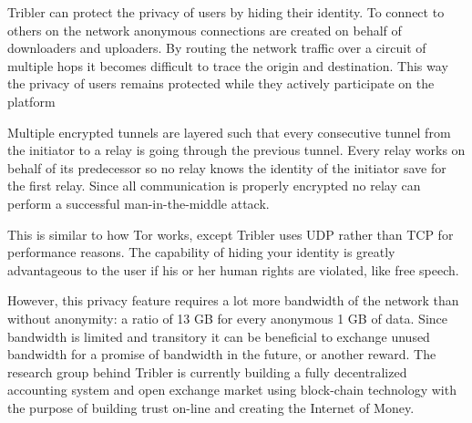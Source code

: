 Tribler can protect the privacy of users by hiding their identity.
To connect to others on the network anonymous connections are created on behalf of downloaders and uploaders.
By routing the network traffic over a circuit of multiple hops it becomes difficult to trace the origin and destination.
This way the privacy of users remains protected while they actively participate on the platform

Multiple encrypted tunnels are layered such that every consecutive tunnel from the initiator to a relay is going through the previous tunnel.
Every relay works on behalf of its predecessor so no relay knows the identity of the initiator save for the first relay.
Since all communication is properly encrypted no relay can perform a successful man-in-the-middle attack.

This is similar to how Tor works, except Tribler uses UDP rather than TCP for performance reasons.
The capability of hiding your identity is greatly advantageous to the user if his or her human rights are violated, like free speech.

However, this privacy feature requires a lot more bandwidth of the network than without anonymity: a ratio of 13 GB for every anonymous 1 GB of data.
Since bandwidth is limited and transitory it can be beneficial to exchange unused bandwidth for a promise of bandwidth in the future, or another reward.
The research group behind Tribler is currently building a fully decentralized accounting system and open exchange market using block-chain technology with the purpose of building trust on-line and creating the Internet of Money.

